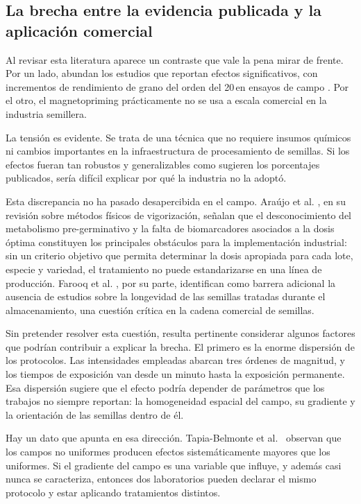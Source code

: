 \subsection{La brecha entre la evidencia publicada y la aplicación comercial}
\label{subsec:brechas}

Al revisar esta literatura aparece un contraste que vale la pena mirar de frente. Por un lado, abundan los estudios que reportan efectos significativos, con incrementos de rendimiento de grano del orden del 20\,\pct en ensayos de campo \cite{vashisth_joshi_2017, siyami_2018}. Por el otro, el magnetopriming prácticamente no se usa a escala comercial en la industria semillera.

La tensión es evidente. Se trata de una técnica que no requiere insumos químicos ni cambios importantes en la infraestructura de procesamiento de semillas. Si los efectos fueran tan robustos y generalizables como sugieren los porcentajes publicados, sería difícil explicar por qué la industria no la adoptó.

Esta discrepancia no ha pasado desapercibida en el campo. Araújo et al. \cite{araujo_2016}, en su revisión sobre métodos físicos de vigorización, señalan que el desconocimiento del metabolismo pre-germinativo y la falta de biomarcadores asociados a la dosis óptima constituyen los principales obstáculos para la implementación industrial: sin un criterio objetivo que permita determinar la dosis apropiada para cada lote, especie y variedad, el tratamiento no puede estandarizarse en una línea de producción. Farooq et al. \cite{farooq_2019}, por su parte, identifican como barrera adicional la ausencia de estudios sobre la longevidad de las semillas tratadas durante el almacenamiento, una cuestión crítica en la cadena comercial de semillas.

Sin pretender resolver esta cuestión, resulta pertinente considerar algunos factores que podrían contribuir a explicar la brecha. El primero es la enorme dispersión de los protocolos. Las intensidades empleadas abarcan tres órdenes de magnitud, y los tiempos de exposición van desde un minuto hasta la exposición permanente. Esa dispersión sugiere que el efecto podría depender de parámetros que los trabajos no siempre reportan: la homogeneidad espacial del campo, su gradiente y la orientación de las semillas dentro de él.

Hay un dato que apunta en esa dirección. Tapia-Belmonte et al.~\cite{tapia_belmonte_2023} observan que los campos no uniformes producen efectos sistemáticamente mayores que los uniformes. Si el gradiente del campo es una variable que influye, y además casi nunca se caracteriza, entonces dos laboratorios pueden declarar el mismo protocolo y estar aplicando tratamientos distintos.

